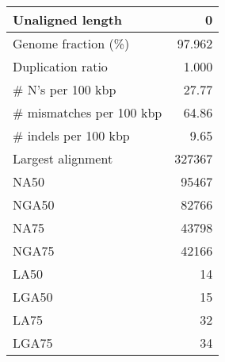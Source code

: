 \documentclass[12pt,a4paper]{article}
\begin{document}
\begin{table}[ht]
\begin{center}
\begin{tabular}{|l*{1}{|r}|}
Unaligned length & 0 \\ \hline
Genome fraction (\%) & 97.962 \\ \hline
Duplication ratio & 1.000 \\ \hline
\# N's per 100 kbp & 27.77 \\ \hline
\# mismatches per 100 kbp & 64.86 \\ \hline
\# indels per 100 kbp & 9.65 \\ \hline
Largest alignment & 327367 \\ \hline
NA50 & 95467 \\ \hline
NGA50 & 82766 \\ \hline
NA75 & 43798 \\ \hline
NGA75 & 42166 \\ \hline
LA50 & 14 \\ \hline
LGA50 & 15 \\ \hline
LA75 & 32 \\ \hline
LGA75 & 34 \\ \hline
\end{tabular}
\end{center}
\end{table}
\end{document}
